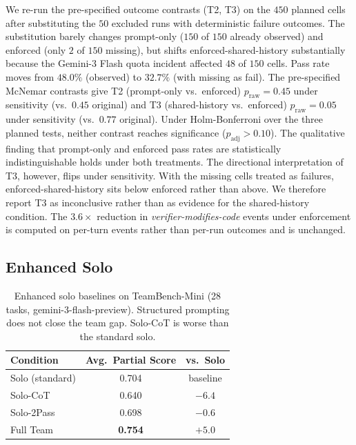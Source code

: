 \documentclass{article}
\begin{document}
We re-run the pre-specified outcome contrasts (T2, T3) on the $450$ planned cells after substituting the $50$ excluded runs with deterministic failure outcomes. The substitution barely changes prompt-only ($150$ of $150$ already observed) and enforced (only $2$ of $150$ missing), but shifts enforced-shared-history substantially because the Gemini-3 Flash quota incident affected $48$ of $150$ cells. Pass rate moves from $48.0\%$ (observed) to $32.7\%$ (with missing as fail). The pre-specified McNemar contrasts give T2 (prompt-only vs.\ enforced) $p_{\text{raw}} = 0.45$ under sensitivity (vs.\ $0.45$ original) and T3 (shared-history vs.\ enforced) $p_{\text{raw}} = 0.05$ under sensitivity (vs.\ $0.77$ original). Under Holm-Bonferroni over the three planned tests, neither contrast reaches significance ($p_{\text{adj}} > 0.10$). The qualitative finding that prompt-only and enforced pass rates are statistically indistinguishable holds under both treatments. The directional interpretation of T3, however, flips under sensitivity. With the missing cells treated as failures, enforced-shared-history sits below enforced rather than above. We therefore report T3 as inconclusive rather than as evidence for the shared-history condition. The $3.6\times$ reduction in \emph{verifier-modifies-code} events under enforcement is computed on per-turn events rather than per-run outcomes and is unchanged.

\subsection{Enhanced Solo}
\label{app:enhanced-solo}

\begin{table}[h]
\centering
\caption{Enhanced solo baselines on TeamBench-Mini (28 tasks, gemini-3-flash-preview). Structured prompting does not close the team gap. Solo-CoT is worse than the standard solo.}
\label{tab:enhanced-solo}
\small
\begin{tabular}{lcc}
\toprule
Condition & Avg.\ Partial Score & vs.\ Solo \\
\midrule
Solo (standard) & 0.704 & baseline \\
Solo-CoT        & 0.640 & $-6.4$ \\
Solo-2Pass      & 0.698 & $-0.6$ \\
Full Team         & \textbf{0.754} & $+5.0$ \\
\bottomrule
\end{tabular}
\end{table}
\end{document}
